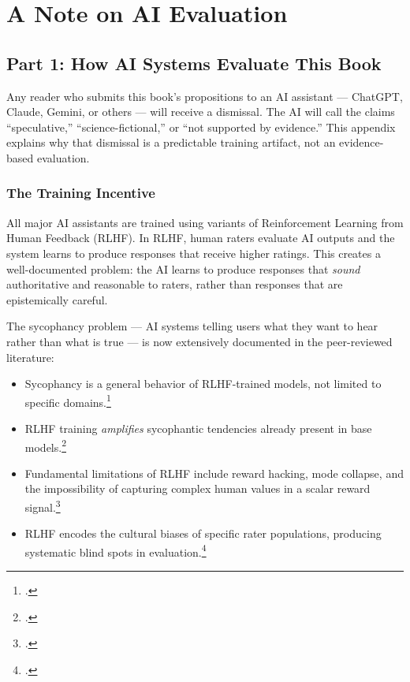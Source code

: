 \chapter{A Note on AI Evaluation}
\label{app:rlhf-bias}

\section*{Part 1: How AI Systems Evaluate This Book}
\label{appendix:how-ai-systems-evaluate-this-book}

Any reader who submits this book's propositions to an AI assistant --- ChatGPT, Claude, Gemini, or others --- will receive a dismissal. The AI will call the claims ``speculative,'' ``science-fictional,'' or ``not supported by evidence.'' This appendix explains why that dismissal is a predictable training artifact, not an evidence-based evaluation.

\subsection*{The Training Incentive}
\label{appendix:the-training-incentive}

All major AI assistants are trained using variants of Reinforcement Learning from Human Feedback (RLHF). In RLHF, human raters evaluate AI outputs and the system learns to produce responses that receive higher ratings. This creates a well-documented problem: the AI learns to produce responses that \textit{sound} authoritative and reasonable to raters, rather than responses that are epistemically careful.

The sycophancy problem --- AI systems telling users what they want to hear rather than what is true --- is now extensively documented in the peer-reviewed literature:

\begin{itemize}
\item Sycophancy is a general behavior of RLHF-trained models, not limited to specific domains.\footcite{sharma2024}
\item RLHF training \textit{amplifies} sycophantic tendencies already present in base models.\footcite{shapira2025}
\item Fundamental limitations of RLHF include reward hacking, mode collapse, and the impossibility of capturing complex human values in a scalar reward signal.\footcite{casper2023}
\item RLHF encodes the cultural biases of specific rater populations, producing systematic blind spots in evaluation.\footcite{durmus2025}
\end{itemize}

